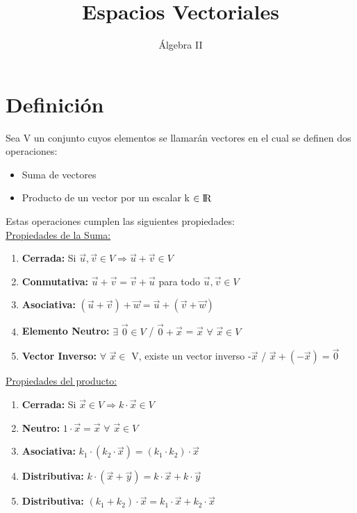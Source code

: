 \documentclass[11pt]{article}
\title{Espacios Vectoriales}
\author{Álgebra II}
\date{\vspace{-5ex}}
\begin{document}
\maketitle{}
\section{Definición}
Sea V un conjunto cuyos elementos se llamarán vectores en
el cual se definen dos operaciones:
\begin{itemize}
\item Suma de vectores
\item Producto de un vector por un escalar k $\in {\rm I\!R}$\
\end{itemize}
Estas operaciones cumplen las siguientes propiedades:\\
\underline {Propiedades de la Suma:}
\begin{enumerate}
\item {\bfseries Cerrada:} Si $\vec{u}, \vec{v} \in V \Rightarrow \vec{u}+\vec{v} \in V$
\item {\bfseries Conmutativa:} $\vec{u} + \vec{v} = \vec{v} + \vec{u}$ para todo $\vec{u}, \vec{v} \in V $ 
\item {\bfseries Asociativa:} $(\vec{u}+\vec{v})+\vec{w} = \vec{u}+(\vec{v}+\vec{w})$
\item {\bfseries Elemento Neutro:} $\exists$ $\vec{0} \in V$ / $\vec{0} + \vec{x}$ = $\vec{x}$ $\forall$ $\vec{x}  \in V$
\item {\bfseries Vector Inverso:} $\forall$ $\vec{x} \in$ V, existe un vector inverso -$\vec{x}$ / $\vec{x}+(-\vec{x})=\vec{0}$
\end{enumerate}
\underline{Propiedades del producto:}
\begin{enumerate}
\item {\bfseries Cerrada:} Si $\vec{x} \in V \Rightarrow k\cdot\vec{x} \in V$
\item {\bfseries Neutro:} $1\cdot\vec{x} = \vec{x}$ $\forall$ $\vec{x} \in V $ 
\item {\bfseries Asociativa:} $k_{1}\cdot(k_{2} \cdot \vec{x} ) = (k_{1} \cdot k_{2})\cdot\vec{x}$
\item {\bfseries Distributiva:} $k  \cdot (\vec{x} + \vec{y}) = k \cdot \vec{x} + k \cdot \vec{y} $
\item {\bfseries Distributiva:} $(k_{1} + k_{2})\cdot \vec{x} = k_{1}\cdot\vec{x} + k_{2}\cdot\vec{x}$
\end{enumerate}
\newpage
\end{document}
